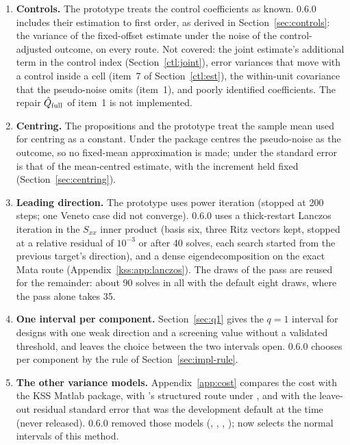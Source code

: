 \begin{enumerate}[leftmargin=1.6em,itemsep=3pt]
eigenvalues of the estimated covariance of the three base components to zero. 0.6.0 reports the covariance as
computed; a variance estimate that is not positive withholds the normal interval of that component, and the
default then reports its $q=1$ interval where it exists.
\item \textbf{Controls.} The prototype treats the control coefficients as known. 0.6.0 includes their estimation
to first order, as derived in Section~\ref{sec:controls}: the variance of the fixed-offset estimate under the noise
of the control-adjusted outcome, on every route. Not covered: the joint estimate's additional term in the control
index (Section~\ref{ctl:joint}), error variances that move with a control inside a cell (item~7 of
Section~\ref{ctl:est}), the within-unit covariance that the pseudo-noise omits (item~1), and poorly identified
coefficients. The repair $\hat Q_{\rm full}$ of item~1 is not implemented.
\item \textbf{Centring.} The propositions and the prototype treat the sample mean used for centring as a constant. Under
 the package centres the pseudo-noise as the outcome, so no fixed-mean approximation is made;
under  the standard error is that of the mean-centred estimate, with the increment
held fixed (Section~\ref{sec:centring}).
\item \textbf{Leading direction.} The prototype uses power iteration (stopped at 200 steps; one Veneto case did
not converge). 0.6.0 uses a thick-restart Lanczos iteration in the $S_{xx}$ inner product (basis six, three Ritz
vectors kept, stopped at a relative residual of $10^{-3}$ or after 40 solves, each search started from the
previous target's direction), and a dense eigendecomposition on the exact Mata route
(Appendix~\ref{kss:app:lanczos}). The draws of the pass are reused for the remainder: about 90 solves in all with
the default eight draws, where the pass alone takes 35.
\item \textbf{One interval per component.} Section~\ref{sec:q1} gives the $q=1$ interval for designs with one weak direction
and a screening value without a validated threshold, and leaves the choice between the two intervals open.
0.6.0 chooses per component by the rule of Section~\ref{sec:impl-rule}.
\item \textbf{The other variance models.} Appendix~\ref{app:cost} compares the cost with the KSS Matlab package,
with \fevc's structured route under , and with the leave-out residual standard error that
was the development default at the time (never released). 0.6.0 removed those models (,
, , );  now
selects the normal intervals of this method.
\end{enumerate}

